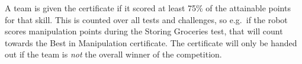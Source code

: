 A team is given the certificate if it scored at least 75\% of the attainable points for that skill.
This is counted over all tests and challenges, so e.g.~if the robot scores manipulation points during the Storing Groceries test, that will count towards the Best in Manipulation certificate.
The certificate will only be handed out if the team is \emph{not} the overall winner of the competition.